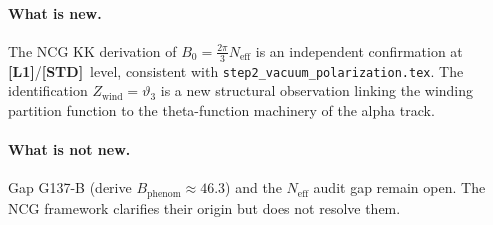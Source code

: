 \documentclass[12pt,a4paper]{article}
\theoremstyle{remark}
\newcommand{\Lone}{\textbf{[L1]}}
\newcommand{\STD}{\textbf{[STD]}}
\begin{document}
\paragraph{What is new.}
The NCG KK derivation of $B_0=\tfrac{2\pi}{3}N_{\mathrm{eff}}$ is an
independent confirmation at \Lone/\STD\ level, consistent with
\texttt{step2\_vacuum\_polarization.tex}.
The identification $Z_{\mathrm{wind}}=\vartheta_3$ is a new structural
observation linking the winding partition function to the theta-function
machinery of the alpha track.

\paragraph{What is not new.}
Gap G137-B (derive $B_{\mathrm{phenom}}\approx 46.3$) and the $N_{\mathrm{eff}}$
audit gap remain open.  The NCG framework clarifies their origin but does
not resolve them.
\end{document}
